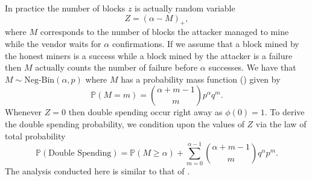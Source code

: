 In practice the number of blocks $z$ is actually random variable 
$$
Z = (\alpha -M)_+,
$$ 
where $M$ corresponds to the number of blocks the attacker managed to mine while the vendor waits for $\alpha$ confirmations. If we assume that a block mined by the honest miners is a success while a block mined by the attacker is a failure then $M$ actually counts the number of failure before $\alpha$ successes. We have that $M\sim \text{Neg-Bin}(\alpha, p)$ where $M$ has a probability mass function (\pmf) given by 
$$
\mathbb{P}(M = m) = \binom{\alpha+m-1}{m}p^\alpha q^m.
$$
Whenever $Z = 0$ then double spending occur right away as $\phi(0) =1$. To derive the double spending probability, we condition upon the values of $Z$ via the law of total probability 
$$
\mathbb{P}( \text{Double Spending}) = \mathbb{P}(M\geq \alpha)+\sum_{m = 0}^{\alpha-1}\binom{\alpha+m-1}{m}q^\alpha p^m.
$$
The analysis conducted here is similar to that of \citet{rosenfeld2014analysis}.
